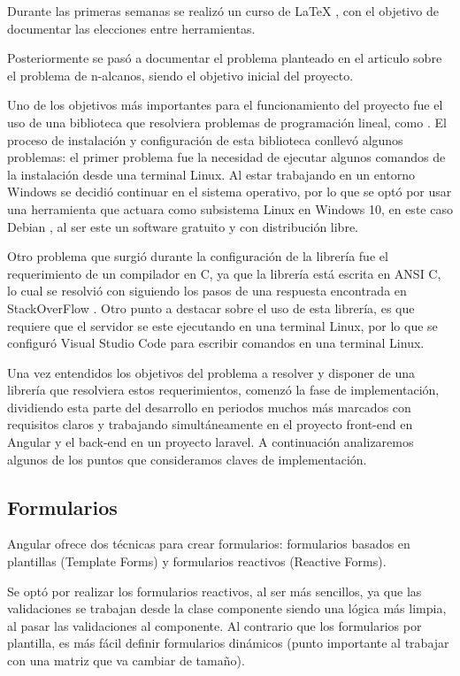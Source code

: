 Durante las primeras semanas se realizó un curso de \LaTeX{} \cite{curso:latex}, con el objetivo de documentar las elecciones entre herramientas. 

Posteriormente  se pasó a documentar el problema planteado en el articulo \cite{problemn-alkanes2007} sobre el problema de n-alcanos, siendo el objetivo inicial del proyecto.

Uno de los objetivos más importantes para el funcionamiento del proyecto fue el uso de una biblioteca que resolviera problemas de programación lineal, como \cite{glpk:package}. El proceso de instalación y configuración de esta biblioteca conllevó algunos problemas: el primer problema fue la necesidad de ejecutar algunos comandos de la instalación desde una terminal Linux. Al estar trabajando en un entorno Windows se decidió continuar en el sistema operativo,  por lo que se optó  por usar una herramienta que actuara como subsistema  Linux en Windows 10, en este caso Debian \cite{debian}, al ser este un software gratuito y con distribución libre.

Otro problema que surgió durante la configuración de la librería fue el requerimiento de un compilador en C, ya que la librería está escrita en ANSI C, lo cual se resolvió con siguiendo los pasos de una respuesta encontrada en StackOverFlow \cite{stack:Compiler}. Otro punto a destacar sobre el uso de esta librería, es que requiere  que el servidor se este ejecutando en una terminal Linux, por lo que se configuró Visual Studio Code para escribir comandos en una terminal Linux.

Una vez entendidos los objetivos del problema a resolver y disponer de una librería que resolviera estos requerimientos, comenzó la fase  de implementación, dividiendo esta parte del desarrollo en periodos muchos más marcados con requisitos claros y trabajando simultáneamente en el proyecto front-end en Angular y el back-end en un proyecto laravel. A continuación analizaremos algunos de los puntos que consideramos claves de implementación.

\subsection{Formularios}

Angular ofrece dos técnicas para crear formularios: formularios basados en plantillas (Template Forms) y formularios reactivos (Reactive Forms). 

Se optó por realizar los formularios  reactivos, al ser más sencillos, ya que las validaciones se trabajan desde la clase componente siendo  una lógica más limpia, al pasar las validaciones al componente. Al contrario que los formularios por plantilla, es más fácil definir formularios dinámicos (punto importante al trabajar con una matriz que va cambiar de tamaño).

